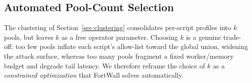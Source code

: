 %

\subsection{Automated Pool-Count Selection}
\label{sec:autotuner}

The clustering of Section~\ref{sec:clustering} consolidates per-script profiles
into $k$ pools, but leaves $k$ as a free operator parameter. Choosing $k$ is a
genuine trade-off: too few pools inflate each script's allow-list toward the
global union, widening the attack surface, whereas too many pools fragment a
fixed worker/memory budget and degrade tail latency. We therefore reframe the
choice of $k$ as a \emph{constrained optimization} that FortWall solves
automatically.

